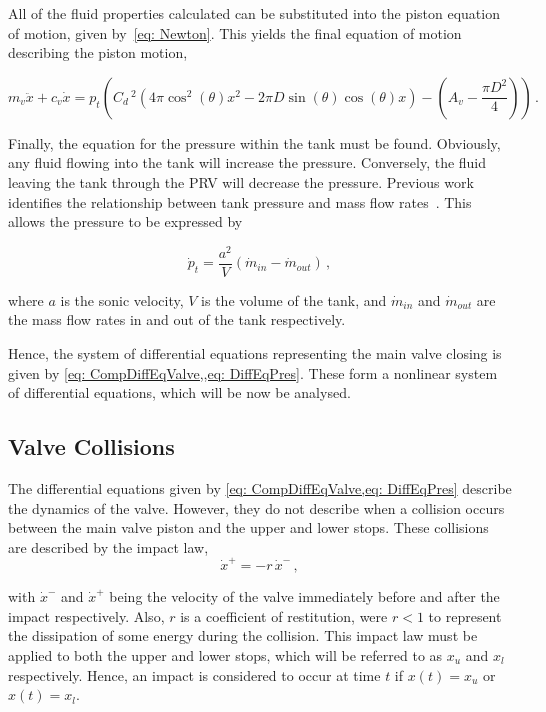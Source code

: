 All of the fluid properties calculated can be substituted into the piston equation of motion, given by~\cref{eq: Newton}. This yields the final equation of motion describing the piston motion,

\begin{equation} \label{eq: CompDiffEqValve}
    m_v \ddot{x} + c_v \dot{x} = p_t \left(
    C_d \,^2 \left( 4 \pi \cos^2(\theta) x^2
    - 2 \pi D \sin(\theta) \cos(\theta) x \right)
    - \left( A_v - \frac{\pi D^2}{4} \right)
    \right) \, .
\end{equation}

Finally, the equation for the pressure within the tank must be found. Obviously, any fluid flowing into the tank will increase the pressure. Conversely, the fluid leaving the tank through the PRV will decrease the pressure. Previous work identifies the relationship between tank pressure and mass flow rates~\cite{Hos2015DynamicModelling}. This allows the pressure to be expressed by

\begin{equation} \label{eq: DiffEqPres}
    \dot{p}_t = \frac{a^2}{V} \left( \dot{m}_{in} - \dot{m}_{out} \right) \, ,
\end{equation}

where $a$ is the sonic velocity, $V$ is the volume of the tank, and $\dot{m}_{in}$ and $\dot{m}_{out}$ are the mass flow rates in and out of the tank respectively.

Hence, the system of differential equations representing the main valve closing is given by \cref{eq: CompDiffEqValve,,eq: DiffEqPres}. These form a nonlinear system of differential equations, which will be now be analysed.

\subsection{Valve Collisions} \label{sec: ValveCollision}

The differential equations given by \cref{eq: CompDiffEqValve,eq: DiffEqPres} describe the dynamics of the valve. However, they do not describe when a collision occurs between the main valve piston and the upper and lower stops. These collisions are described by the impact law,
~
\begin{equation*}
    \dot{x}^+ = - r \, \dot{x}^- \, ,
\end{equation*}

with $\dot{x}^-$ and $\dot{x}^+$ being the velocity of the valve immediately before and after the impact respectively. Also, $r$ is a coefficient of restitution, were $r < 1$ to represent the dissipation of some energy during the collision. This impact law must be applied to both the upper and lower stops, which will be referred to as $x_u$ and $x_l$ respectively. Hence, an impact is considered to occur at time $t$ if $x(t) = x_u$ or $x(t) = x_l$.

